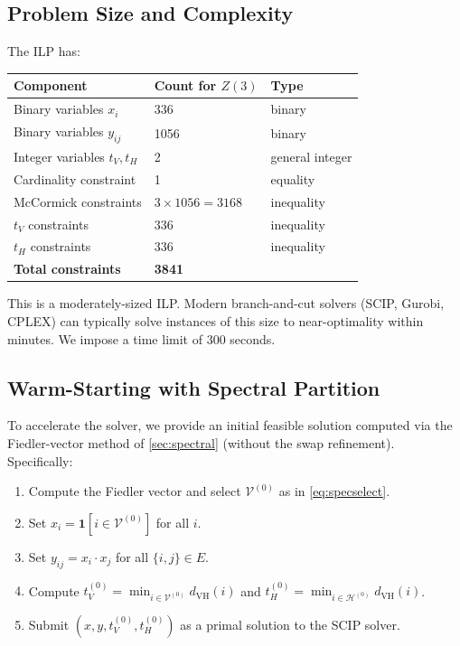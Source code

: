 \documentclass[11pt,a4paper]{article}
\newcommand{\VV}{\mathcal{V}}
\newcommand{\HH}{\mathcal{H}}
\begin{document}
\subsection{Problem Size and Complexity}

The ILP has:
\begin{center}
\begin{tabular}{@{}lll@{}}
\toprule
\textbf{Component} & \textbf{Count for $Z(3)$} & \textbf{Type} \\
\midrule
Binary variables $x_i$ & 336 & binary \\
Binary variables $y_{ij}$ & 1056 & binary \\
Integer variables $t_V, t_H$ & 2 & general integer \\
\midrule
Cardinality constraint & 1 & equality \\
McCormick constraints & $3\times 1056 = 3168$ & inequality \\
$t_V$ constraints & 336 & inequality \\
$t_H$ constraints & 336 & inequality \\
\midrule
\textbf{Total constraints} & \textbf{3841} & \\
\bottomrule
\end{tabular}
\end{center}

This is a moderately-sized ILP.  Modern branch-and-cut solvers (SCIP, Gurobi, CPLEX) can typically solve instances of this size to near-optimality within minutes.  We impose a time limit of 300 seconds.

\subsection{Warm-Starting with Spectral Partition}\label{sec:warmstart}

To accelerate the solver, we provide an initial feasible solution computed via the Fiedler-vector method of \cref{sec:spectral} (without the swap refinement).  Specifically:
\begin{enumerate}[nosep]
  \item Compute the Fiedler vector and select $\VV^{(0)}$ as in \cref{eq:specselect}.
  \item Set $x_i = \mathbf{1}[i \in \VV^{(0)}]$ for all $i$.
  \item Set $y_{ij} = x_i \cdot x_j$ for all $\{i,j\}\in E$.
  \item Compute $t_V^{(0)} = \min_{i\in\VV^{(0)}} d_{\mathrm{VH}}(i)$ and $t_H^{(0)} = \min_{i\in\HH^{(0)}} d_{\mathrm{VH}}(i)$.
  \item Submit $(x, y, t_V^{(0)}, t_H^{(0)})$ as a primal solution to the SCIP solver.
\end{enumerate}
\end{document}
